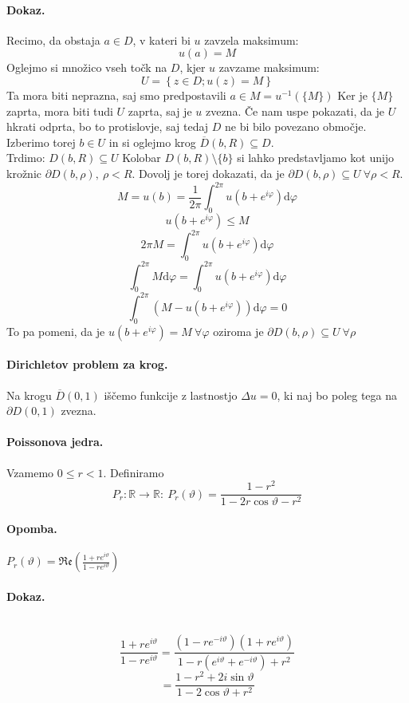 \documentclass[a4paper]{article}
\newcommand{\dif}{\mathrm{d}}
\newcommand{\R}{\mathbb{R}}
\newcommand{\fn}[3]{{#1}\colon {#2} \rightarrow {#3}}
\begin{document}
\paragraph{Dokaz.} Recimo, da obstaja $a\in D$, v kateri bi $u$ zavzela maksimum:
$$u(a) = M$$
Oglejmo si množico vseh točk na $D$, kjer $u$ zavzame maksimum:
$$U = \left\{z\in D; u(z) = M\right\}$$
Ta mora biti neprazna, saj smo predpostavili $a \in M = u^{-1}(\{M\})$
Ker je $\{M\}$ zaprta, mora biti tudi $U$ zaprta, saj je $u$ zvezna. Če nam uspe pokazati, da je $U$ hkrati odprta, bo to protislovje, saj tedaj $D$ ne bi bilo povezano območje.
Izberimo torej $b \in U$ in si oglejmo krog $\overline{D}(b, R) \subseteq D$. \\
Trdimo: $D(b, R) \subseteq U$
Kolobar $D(b, R) \setminus \{b\}$ si lahko predstavljamo kot unijo krožnic $\partial D(b,\rho),~\rho<R$. Dovolj je torej dokazati, da je $\partial D(b, \rho) \subseteq U ~\forall \rho < R$. \\
$$M = u(b) = \frac{1}{2\pi}\int_{0}^{2\pi}u(b + e^{i\varphi})\dif\varphi$$
$$u(b+e^{i\varphi}) \leq M$$
$$2\pi M =  \int_{0}^{2\pi} u(b + e^{i\varphi})\dif\varphi$$
$$\int_{0}^{2\pi} M\dif\varphi = \int_{0}^{2\pi} u(b + e^{i\varphi})\dif\varphi$$
$$\int_{0}^{2\pi} \left(M - u(b + e^{i\varphi})\right)\dif\varphi = 0$$
To pa pomeni, da je $u(b + e^{i\varphi}) = M~\forall\varphi$ oziroma je $\partial D(b, \rho) \subseteq U~\forall \rho$
\paragraph{Dirichletov problem za krog.} Na krogu $\overline{D}(0, 1)$ iščemo funkcije z lastnostjo $\Delta u = 0$, ki naj bo poleg tega na $\partial D(0, 1)$ zvezna.
\paragraph{Poissonova jedra.} Vzamemo $0 \leq r < 1$. Definiramo $$\fn{P_r}{\R}{\R}:~P_r(\vartheta) = \frac{1-r^2}{1-2r\cos\vartheta - r^2}$$
\paragraph{Opomba.} $\displaystyle{P_r(\vartheta) = \mathfrak{Re}\left(\frac{1 + re^{i\vartheta}}{1 - re^{i\vartheta}}\right)}$
\paragraph{Dokaz.} \text{} \\
$$\frac{1 + re^{i\vartheta}}{1 - re^{i\vartheta}} = \frac{(1 - re^{-i\vartheta})(1 + re^{i\vartheta})}{1 - r(e^{i\vartheta} + e^{-i\vartheta}) + r^2}$$
$$= \frac{1 - r^2 + 2i\sin\vartheta}{1 - 2\cos\vartheta + r^2}$$
\end{document}
